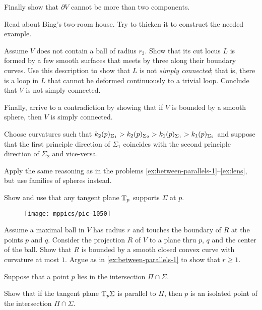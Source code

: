 Finally show that $\partial V$ cannot be more than two components.

Read about Bing's two-room house.
Try to thicken it to construct the needed example.

Assume $V$ does not contain a ball of radius $r_3$.
Show that its cut locus $L$ is formed by a few smooth surfaces that meets by three along their boundary curves.
Use this description to show that $L$ is not \emph{simply connected}; that is, there is a loop in $L$ that cannot be deformed continuously to a trivial loop.
Conclude that $V$ is not simply connected.

Finally, arrive to a contradiction by showing that if $V$ is bounded by a smooth sphere, then $V$ is simply connected. 

\setcounter{eqtn}{0}

Choose curvatures such that 
$k_2(p)_{\Sigma_1}\z>k_2(p)_{\Sigma_2}> k_1(p)_{\Sigma_1}> k_1(p)_{\Sigma_2}$ and suppose that the first principle direction of $\Sigma_1$ coincides with the second principle direction of $\Sigma_2$ and vice-versa.

 Apply the same reasoning as in the problems \ref{ex:between-parallels-1}--\ref{ex:lens}, but use families of spheres instead.


 Show and use that any tangent plane $\mathrm{T}_p$ supports $\Sigma$ at $p$.

{

\begin{wrapfigure}{r}{25 mm}
\vskip-8mm
\centering
\texttt{[image: mppics/pic-1050]}
\vskip-0mm
\end{wrapfigure}

Assume a maximal ball in $V$ has radius $r$ and touches the boundary of $R$ at the points $p$ and $q$.
Consider the projection $R$ of $V$ to a plane thru $p$, $q$ and the center of the ball.
Show that $R$ is bounded by a smooth closed convex curve with curvature at most $1$.
Argue as in \ref{ex:between-parallels-1} to
show that $r\ge 1$.

}
 

Suppose that a point $p$ lies in the intersection $\Pi\cap\Sigma$.

Show that if the tangent plane $\mathrm{T}_p\Sigma$ is parallel to $\Pi$,
then $p$ is an isolated point of the intersection $\Pi\cap\Sigma$.

